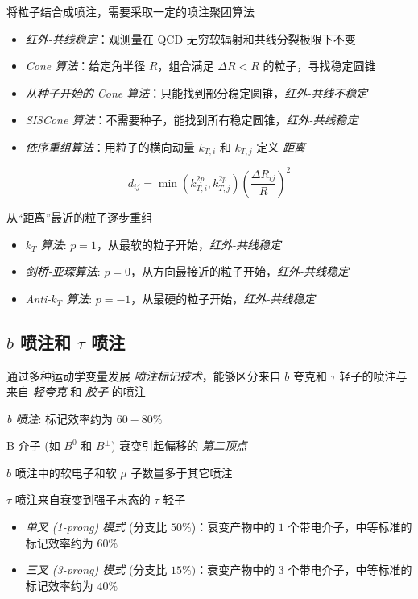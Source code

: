 \documentclass[oneside,a4paper,openany,11pt]{ctexbook}
\begin{document}
将粒子结合成喷注，需要采取一定的喷注聚团算法

\begin{itemize}
    \item \emph{红外-共线稳定}：观测量在 QCD 无穷软辐射和共线分裂极限下不变
    \item \emph{Cone 算法}：给定角半径 $R$，组合满足 $\Delta R < R$ 的粒子，寻找稳定圆锥
    \item \emph{从种子开始的 Cone 算法}：只能找到部分稳定圆锥，\emph{红外-共线不稳定}
    \item \emph{SISCone 算法}：不需要种子，能找到所有稳定圆锥，\emph{红外-共线稳定}
    \item \emph{依序重组算法}：用粒子的横向动量 $k_{T,i}$ 和 $k_{T,j}$ 定义 \emph{距离}
\end{itemize}

\begin{equation}
    d_{ij} = \min \left(k_{T,i}^{2p}, k_{T,j}^{2p}\right) \left(\frac{\Delta R_{ij}}{R}\right)^2
\end{equation}

从“距离”最近的粒子逐步重组

\begin{itemize}
    \item \emph{$k_T$ 算法}: $p=1$，从最软的粒子开始，\emph{红外-共线稳定}
    \item \emph{剑桥-亚琛算法}: $p=0$，从方向最接近的粒子开始，\emph{红外-共线稳定}
    \item \emph{Anti-$k_T$ 算法}: $p=-1$，从最硬的粒子开始，\emph{红外-共线稳定}
\end{itemize}

\subsection{$b$ 喷注和 $\tau$ 喷注}

通过多种运动学变量发展 \emph{喷注标记技术}，能够区分来自 $b$ 夸克和 $\tau$ 轻子的喷注与来自 \emph{轻夸克} 和 \emph{胶子} 的喷注

\emph{b 喷注}: 标记效率约为 $60-80\%$

B 介子 (如 $B^0$ 和 $B^\pm$) 衰变引起偏移的 \emph{第二顶点}

$b$ 喷注中的软电子和软 $\mu$ 子数量多于其它喷注

$\tau$ 喷注来自衰变到强子末态的 $\tau$ 轻子

\begin{itemize}
    \item \emph{单叉 (1-prong) 模式} (分支比 $50\%$)：衰变产物中的 $1$ 个带电介子，中等标准的标记效率约为 $60\%$
    \item \emph{三叉 (3-prong) 模式} (分支比 $15\%)$：衰变产物中的 $3$ 个带电介子，中等标准的标记效率约为 $40\%$
\end{itemize}
\end{document}
